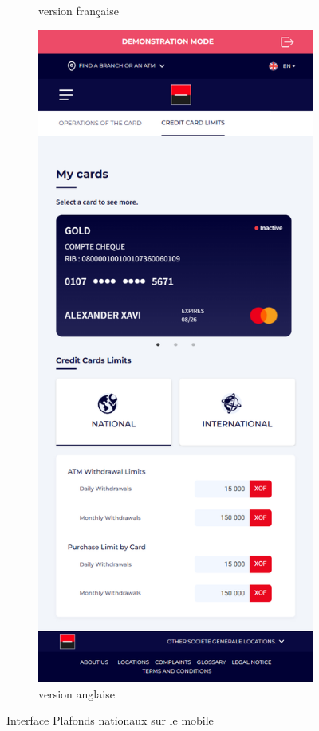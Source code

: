 \begin{figure}[!ht]
\begin{subfigure}[b]{0.49\textwidth}
        \caption{version française}
    \end{subfigure}
    \hfill
    \begin{subfigure}[b]{0.49\textwidth}
        \centering
        \includegraphics[width=\textwidth]{images/screens/limitsnat/mob.png}
        \caption{version anglaise}
    \end{subfigure}
       \caption{Interface Plafonds nationaux sur le mobile}
\end{figure}
\newpage

